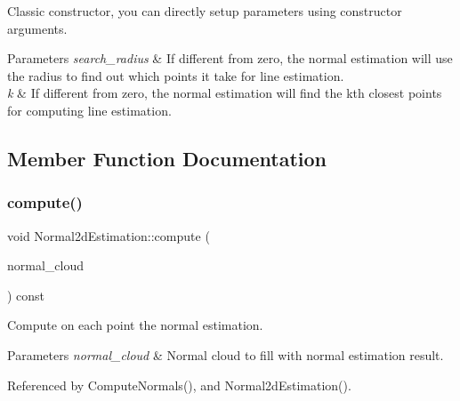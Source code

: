 Classic constructor, you can directly setup parameters using constructor arguments. 


\begin{DoxyParams}{Parameters}
{\em search\+\_\+radius} & If different from zero, the normal estimation will use the radius to find out which points it take for line estimation.\\
\hline
{\em k} & If different from zero, the normal estimation will find the kth closest points for computing line estimation. \\
\hline
\end{DoxyParams}


\subsection{Member Function Documentation}
\mbox{\label{classNormal2dEstimation_a908d3a85cda5b29bb3ef119ab30d6ab6}} 
\subsubsection{\texorpdfstring{compute()}{compute()}\hspace{0.1cm}{\footnotesize\ttfamily [1/2]}}
{\footnotesize\ttfamily void Normal2d\+Estimation\+::compute (\begin{DoxyParamCaption}\item[{const \hyperlink{Normal2dEstimation_8h_a2894055ff89c63cbae90e22dfddaa610}{Ptr\+Cloud} \&}]{normal\+\_\+cloud }\end{DoxyParamCaption}) const}



Compute on each point the normal estimation. 


\begin{DoxyParams}{Parameters}
{\em normal\+\_\+cloud} & Normal cloud to fill with normal estimation result. \\
\hline
\end{DoxyParams}


Referenced by Compute\+Normals(), and Normal2d\+Estimation().

\mbox{\label{classNormal2dEstimation_ac3fd17679a20a7f4faab72f58fdc6199}} 

